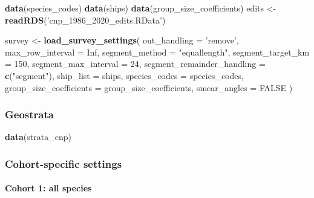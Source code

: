 \documentclass[
]{book}
\newenvironment{Shaded}{\begin{snugshade}}{\end{snugshade}}
\newcommand{\DataTypeTok}[1]{\textcolor[rgb]{0.13,0.29,0.53}{#1}}
\newcommand{\DecValTok}[1]{\textcolor[rgb]{0.00,0.00,0.81}{#1}}
\newcommand{\KeywordTok}[1]{\textcolor[rgb]{0.13,0.29,0.53}{\textbf{#1}}}
\newcommand{\NormalTok}[1]{#1}
\newcommand{\OtherTok}[1]{\textcolor[rgb]{0.56,0.35,0.01}{#1}}
\newcommand{\StringTok}[1]{\textcolor[rgb]{0.31,0.60,0.02}{#1}}
\begin{document}
\begin{Shaded}
\begin{Highlighting}[]
\KeywordTok{data}\NormalTok{(species_codes)}
\KeywordTok{data}\NormalTok{(ships)}
\KeywordTok{data}\NormalTok{(group_size_coefficients)}
\NormalTok{edits <-}\StringTok{ }\KeywordTok{readRDS}\NormalTok{(}\StringTok{'cnp_1986_2020_edits.RData'}\NormalTok{)}

\NormalTok{survey <-}\StringTok{ }\KeywordTok{load_survey_settings}\NormalTok{(}
  \DataTypeTok{out_handling =} \StringTok{'remove'}\NormalTok{,}
  \DataTypeTok{max_row_interval =} \OtherTok{Inf}\NormalTok{,}
  \DataTypeTok{segment_method =} \StringTok{"equallength"}\NormalTok{,}
  \DataTypeTok{segment_target_km =} \DecValTok{150}\NormalTok{,}
  \DataTypeTok{segment_max_interval =} \DecValTok{24}\NormalTok{,}
  \DataTypeTok{segment_remainder_handling =} \KeywordTok{c}\NormalTok{(}\StringTok{"segment"}\NormalTok{),}
  \DataTypeTok{ship_list =}\NormalTok{ ships,}
  \DataTypeTok{species_codes =}\NormalTok{ species_codes,}
  \DataTypeTok{group_size_coefficients =}\NormalTok{ group_size_coefficients,}
  \DataTypeTok{smear_angles =} \OtherTok{FALSE}
\NormalTok{)}
\end{Highlighting}
\end{Shaded}

\hypertarget{geostrata-1}{%
\subsubsection*{Geostrata}\label{geostrata-1}}

\begin{Shaded}
\begin{Highlighting}[]
\KeywordTok{data}\NormalTok{(strata_cnp)}
\end{Highlighting}
\end{Shaded}

\hypertarget{cohort-specific-settings-1}{%
\subsubsection*{Cohort-specific settings}\label{cohort-specific-settings-1}}

\hypertarget{cohort-1-all-species}{%
\paragraph{Cohort 1: all species}\label{cohort-1-all-species}}
\end{document}
